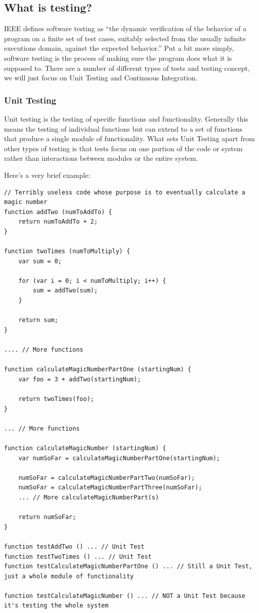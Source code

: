 \documentclass[11pt]{article}
\begin{document}
\subsection{What is testing?}
IEEE defines software testing as ``the dynamic verification of the behavior of a program on a finite set of test cases, suitably selected from the usually infinite executions domain, against the expected behavior.'' \cite{TestingDefinition} Put a bit more simply, software testing is the process of making sure the program does what it is supposed to.
There are a number of different types of tests and testing concept, we will just focus on Unit Testing and Continuous Integration.

\subsubsection{Unit Testing}
Unit testing is the testing of specific functions and functionality. Generally this means the testing of individual functions but can extend to a set of functions that produce a single module of functionality. What sets Unit Testing apart from other types of testing is that tests focus on one portion of the code or system rather than interactions between modules or the entire system.

Here's a very brief example:
\begin{lstlisting}
// Terribly useless code whose purpose is to eventually calculate a magic number
function addTwo (numToAddTo) {
	return numToAddTo + 2;
}

function twoTimes (numToMultiply) {
	var sum = 0;

	for (var i = 0; i < numToMultiply; i++) {
		sum = addTwo(sum);
	}

	return sum;
}

.... // More functions

function calculateMagicNumberPartOne (startingNum) {
	var foo = 3 + addTwo(startingNum);

	return twoTimes(foo);
}

... // More functions

function calculateMagicNumber (startingNum) {
	var numSoFar = calculateMagicNumberPartOne(startingNum);

	numSoFar = calculateMagicNumberPartTwo(numSoFar);
	numSoFar = calculateMagicNumberPartThree(numSoFar);
	... // More calculateMagicNumberPart(s)

	return numSoFar;
}

function testAddTwo () ... // Unit Test
function testTwoTimes () ... // Unit Test
function testCalculateMagicNumberPartOne () ... // Still a Unit Test, just a whole module of functionality

function testCalculateMagicNumber () ... // NOT a Unit Test because it's testing the whole system
\end{lstlisting}
\end{document}
